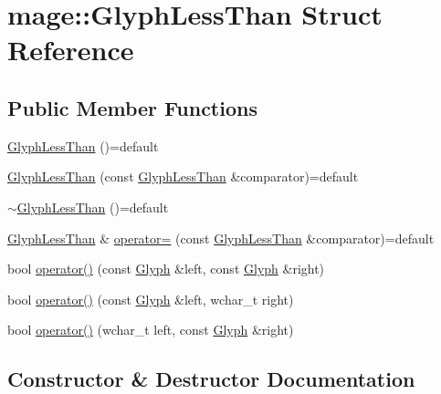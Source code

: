 \hypertarget{structmage_1_1_glyph_less_than}{}\section{mage\+:\+:Glyph\+Less\+Than Struct Reference}
\label{structmage_1_1_glyph_less_than}
\subsection*{Public Member Functions}
\begin{DoxyCompactItemize}
\item 
\hyperlink{structmage_1_1_glyph_less_than_a2ad76294131749c19d83b6f92c74f1dc}{Glyph\+Less\+Than} ()=default
\item 
\hyperlink{structmage_1_1_glyph_less_than_a27fc34d9db41ebba7a7b40864837e7e7}{Glyph\+Less\+Than} (const \hyperlink{structmage_1_1_glyph_less_than}{Glyph\+Less\+Than} \&comparator)=default
\item 
\hyperlink{structmage_1_1_glyph_less_than_ace50804a419a31b0413566b5aba2eeac}{$\sim$\+Glyph\+Less\+Than} ()=default
\item 
\hyperlink{structmage_1_1_glyph_less_than}{Glyph\+Less\+Than} \& \hyperlink{structmage_1_1_glyph_less_than_aa3de6a126c3a70ad452a17b37709eca6}{operator=} (const \hyperlink{structmage_1_1_glyph_less_than}{Glyph\+Less\+Than} \&comparator)=default
\item 
bool \hyperlink{structmage_1_1_glyph_less_than_a5ba9326b1293585e6257cf1d5697a1ba}{operator()} (const \hyperlink{structmage_1_1_glyph}{Glyph} \&left, const \hyperlink{structmage_1_1_glyph}{Glyph} \&right)
\item 
bool \hyperlink{structmage_1_1_glyph_less_than_a263e9b07d9a3d84173739971abc5e217}{operator()} (const \hyperlink{structmage_1_1_glyph}{Glyph} \&left, wchar\+\_\+t right)
\item 
bool \hyperlink{structmage_1_1_glyph_less_than_a1ab127f38f1043b2361dcf73c3510dfd}{operator()} (wchar\+\_\+t left, const \hyperlink{structmage_1_1_glyph}{Glyph} \&right)
\end{DoxyCompactItemize}


\subsection{Constructor \& Destructor Documentation}
\hypertarget{structmage_1_1_glyph_less_than_a2ad76294131749c19d83b6f92c74f1dc}{}\label{structmage_1_1_glyph_less_than_a2ad76294131749c19d83b6f92c74f1dc} 
